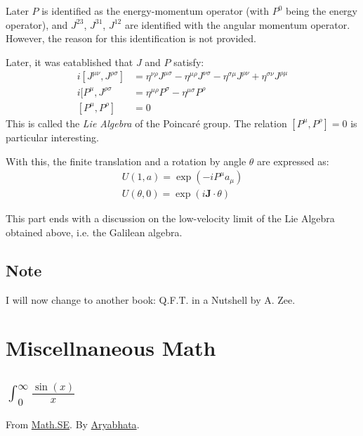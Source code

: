 \documentclass{article}
\numberwithin{equation}{subsection} %
\theoremstyle{definition}
\begin{document}
    Later $P$ is identified as the energy-momentum operator (with
    $P^0$ being the energy operator), and $J^{23}$, $J^{31}$,
    \(J^{12}\) are identified with the angular momentum operator.
    However, the reason for this identification is not provided. 

    Later, it was eatablished that $J$ and $P$ satisfy:
    \begin{align}
        i[J^{\mu\nu},J^{\rho\sigma}] &=
            \eta^{\nu\rho}J^{\mu\sigma} - \eta^{\mu\rho}J^{\nu\sigma}
            -\eta^{\sigma\mu}J^{\rho\nu} + \eta^{\sigma\nu}J^{\rho\mu}
        \\
        i[P^\mu,J^{\rho\sigma} &=
            \eta^{\mu\rho}P^\sigma - \eta^{\mu\sigma}P^{\rho}
        \\
        [P^\mu,P^\rho] &= 0
    \end{align}
    This is called the \textit{Lie Algebra} of the Poincar\'{e}
    group.
    The relation \([P^\mu,P^\rho] = 0\) is particular interesting.

    With this, the finite translation and a rotation by angle
    $\theta$ are expressed as:
    \begin{align}
        U(1,a) = \exp(-iP^\mu a_\mu) \\
        U(\theta,0) = \exp(i \mathbf{J}\cdot \theta)
    \end{align}

    This part ends with a discussion on the low-velocity limit
    of the Lie Algebra obtained above, i.e. the Galilean algebra.
    
    \subsection{Note}
    \label{sec:Note}
    I will now change to another book: Q.F.T. in a Nutshell by A. Zee.


\section{Miscellnaneous Math}
\label{sec:Miscellnaneous_Math}
\subsection{\texorpdfstring{$\int_0^\infty \frac{\sin(x)}{x}$}{}}
From \href{http://math.stackexchange.com/questions/5248/solving-the-integral-int-0-infty-frac-sinxx-dx-frac-pi2}{Math.SE}. 
By \href{http://math.stackexchange.com/users/1102/aryabhata}{Aryabhata}.
\end{document}
